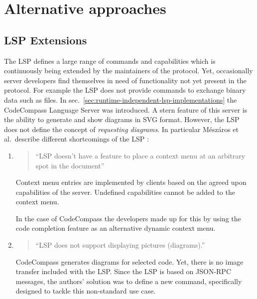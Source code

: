 \documentclass[
  a4paper,
  bibtex,
  english,
  nomenclature]{kthlatex/kththesis/kththesis}
\begin{document}
\hypertarget{sec:alternative-approaches}{%
\section{Alternative approaches}\label{sec:alternative-approaches}}

\hypertarget{sec:lsp-extensions}{%
\subsection{LSP Extensions}\label{sec:lsp-extensions}}

The LSP defines a large range of commands and capabilities which is
continuously being extended by the maintainers of the protocol. Yet,
occasionally server developers find themselves in need of functionality
not yet present in the protocol. For example the LSP does not provide
commands to exchange binary data such as files. In
sec.~\ref{sec:runtime-independent-lsp-implementations} the CodeCompass
Language Server was introduced. A stern feature of this server is the
ability to generate and show diagrams in SVG format. However, the LSP
does not define the concept of \emph{requesting diagrams}. In particular
Mészáros et al.~describe different shortcomings of the LSP :

\begin{enumerate}
\def\labelenumi{\arabic{enumi}.}
\item
  \begin{quote}
  ``LSP doesn't have a feature to place a context menu at an arbitrary
  spot in the document''
  \end{quote}

  Context menu entries are implemented by clients based on the agreed
  upon capabilities of the server. Undefined capabilities cannot be
  added to the context menu.

  In the case of CodeCompass the developers made up for this by using
  the code completion feature as an alternative dynamic context menu.
\item
  \begin{quote}
  ``LSP does not support displaying pictures (diagrams).''
  \end{quote}

  CodeCompass generates diagrams for selected code. Yet, there is no
  image transfer included with the LSP. Since the LSP is based on
  JSON-RPC messages, the authors' solution was to define a new command,
  specifically designed to tackle this non-standard use case.
\end{enumerate}
\end{document}
